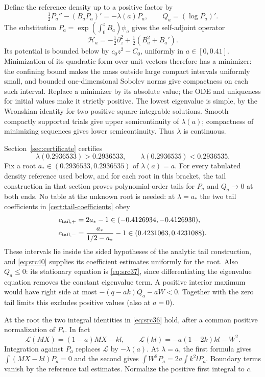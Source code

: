 \documentclass[11pt,a4paper]{article}
\numberwithin{equation}{section}
\theoremstyle{definition}
\theoremstyle{remark}
\begin{document}
Define the reference density up to a positive factor by
\[
 \tfrac12P_a''-(B_aP_a)'=-\lambda(a)P_a,
 \qquad Q_a=(\log P_a)'.
\]
The substitution $P_a=\exp(\int_0^zB_a)\psi_a$ gives the
self-adjoint operator
\[
 \mathcal H_a=-\tfrac12\partial_z^2+\tfrac12(B_a^2+B_a').
\]
Its potential is bounded below by $c_0z^2-C_0$, uniformly in
$a\in[0,0.41]$.  Minimization of its quadratic form over unit vectors
therefore has a minimizer: the confining bound makes the mass outside
large compact intervals uniformly small, and bounded one-dimensional
Sobolev norms give compactness on each such interval.  Replace a
minimizer by its absolute value; the ODE and uniqueness for initial
values make it strictly positive.  The lowest eigenvalue is simple,
by the Wronskian identity for two positive square-integrable
solutions.  Smooth compactly supported trials give upper
semicontinuity of $\lambda(a)$; compactness of minimizing sequences
gives lower semicontinuity.  Thus $\lambda$ is continuous.

Section~\ref{sec:certificate} certifies
\[
 \lambda(0.2936533)>0.2936533,\qquad
 \lambda(0.2936535)<0.2936535.
\]
Fix a root $a_*\in(0.2936533,0.2936535)$ of $\lambda(a)=a$.
For every tabulated density reference used below, and for each root in
this bracket, the tail construction in that section proves
polynomial-order tails for $P_a$ and $Q_a\to0$ at both ends.  No table at the unknown root is needed:
at $\lambda=a_*$ the two tail coefficients in
\eqref{cert:tail-coefficients} obey
\[
 \begin{aligned}
 c_{{\rm tail},+}&=2a_*-1\in(-0.4126934,-0.4126930),\\
 c_{{\rm tail},-}&=\frac{a_*}{1/2-a_*}-1\in(0.4231063,0.4231088).
 \end{aligned}
\]
These intervals lie inside the sided hypotheses of the analytic
tail construction, and \eqref{eq:src40} supplies its coefficient
estimates uniformly for the root.  Also $Q_a\le0$: its stationary equation
is \eqref{eq:src37}, since differentiating the eigenvalue equation
removes the constant eigenvalue term.  A positive interior maximum
would have right side at most $-(q-ak)Q_a-aW<0$.  Together with the
zero tail limits this excludes positive values (also at $a=0$).

At the root the two integral identities in \eqref{eq:src36} hold,
after a common positive normalization of $P_*$.  In fact
\[
 \mathcal L(MX)=(1-a)MX-kl,
 \qquad
 \mathcal L(kl)=-a(1-2k)kl-W^2.
\]
Integration against $P_a$ replaces $\mathcal L$ by $-\lambda(a)$.
At $\lambda=a$, the first formula gives
$\int(MX-kl)P_a=0$ and the second gives
$\int W^2P_a=2a\int k^2lP_a$.  Boundary terms vanish by the reference
tail estimates.  Normalize the positive first integral to $c$.
\end{document}
